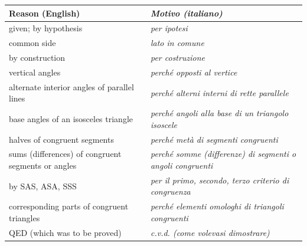 \begin{table}[htbp]
\centering
\small
\begin{tabularx}{\textwidth}{@{}>{\raggedright\arraybackslash}X >{\raggedright\arraybackslash\itshape\leavevmode\color{itgreen}}X@{}}
\toprule
\textbf{Reason (English)} & \textbf{\upshape Motivo (italiano)}\\
\midrule
given; by hypothesis & per ipotesi\\
common side & lato in comune\\
by construction & per costruzione\\
vertical angles & perché opposti al vertice\\
alternate interior angles of parallel lines & perché alterni interni di rette parallele\\
base angles of an isosceles triangle & perché angoli alla base di un triangolo isoscele\\
halves of congruent segments & perché metà di segmenti congruenti\\
sums (differences) of congruent segments or angles & perché somme (differenze) di segmenti o angoli congruenti\\
by SAS, ASA, SSS & per il primo, secondo, terzo criterio di congruenza\\
corresponding parts of congruent triangles & perché elementi omologhi di triangoli congruenti\\
QED (which was to be proved) & c.v.d. (come volevasi dimostrare)\\
\bottomrule
\end{tabularx}
\label{tab:phrases}
\end{table}

